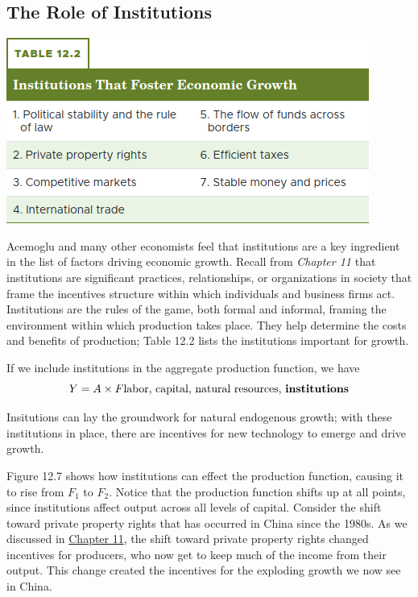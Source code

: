\documentclass[11pt]{article} %
\begin{document}
\subsection*{The Role of Institutions}
\begin{center}
\includegraphics[scale=1]{Images/Table 12.2.png}
\end{center}
Acemoglu and many other economists feel that institutions are a key ingredient in the list of factors driving economic growth. Recall from \textit{Chapter 11} that institutions are significant practices, relationships, or organizations in society that frame the incentives structure within which individuals and business firms act. Institutions are the rules of the game, both formal and informal, framing the environment within which production takes place. They help determine the costs and benefits of production; Table 12.2 lists the institutions important for growth.

If we include institutions in the aggregate production function, we have
\begin{equation}
Y = A \times F\text{labor, capital, natural resources, \textbf{institutions}}
\end{equation}

Insitutions can lay the groundwork for natural endogenous growth; with these institutions in place, there are incentives for new technology to emerge and drive growth.

Figure 12.7 shows how institutions can effect the production function, causing it to rise from \(F_1\) to \(F_2\). Notice that the production function shifts up at all points, since institutions affect output across all levels of capital. Consider the shift toward private property rights that has occurred in China since the 1980s. As we discussed in \underline{Chapter 11}, the shift toward private property rights changed incentives for producers, who now get to keep much of the income from their output. This change created the incentives for the exploding growth we now see in China.
\end{document}
